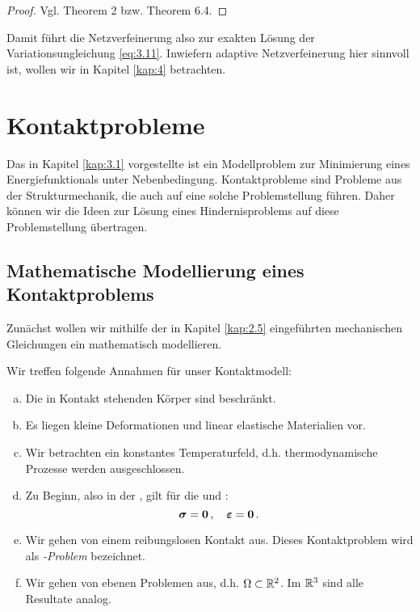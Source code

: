 \begin{proof}
Vgl. \cite{Falk} Theorem 2 bzw. \cite{EPS} Theorem 6.4.
\end{proof}


Damit führt die Netzverfeinerung also zur exakten Lösung der Variationsungleichung \eqref{eq:3.11}. Inwiefern adaptive Netzverfeinerung hier sinnvoll ist, wollen wir in Kapitel \ref{kap:4} betrachten.








\section{Kontaktprobleme}
\label{kap:3.2}


Das in Kapitel \ref{kap:3.1} vorgestellte  ist ein Modellproblem zur Minimierung eines Energiefunktionals unter Nebenbedingung. Kontaktprobleme sind Probleme aus der Strukturmechanik, die auch auf eine solche Problemstellung führen. Daher können wir die Ideen zur Lösung eines Hindernisproblems auf diese Problemstellung übertragen.


\subsection{Mathematische Modellierung eines Kontaktproblems}
\label{kap:3.2.1}

Zunächst wollen wir mithilfe der in Kapitel \ref{kap:2.5} eingeführten mechanischen Gleichungen ein  mathematisch modellieren.

\begin{vor}\label{vor:3.18}
Wir treffen folgende Annahmen für unser Kontaktmodell:
\begin{enumerate}[(a)]
\item Die in Kontakt stehenden Körper sind beschränkt.
\item Es liegen kleine Deformationen und linear elastische Materialien vor.
\item Wir betrachten ein konstantes Temperaturfeld, d.h. thermodynamische Prozesse werden ausgeschlossen.
\item Zu Beginn, also in der , gilt für die  und : 
\[
	\boldsymbol \sigma = \boldsymbol 0\, , \quad \boldsymbol {\varepsilon} =\boldsymbol 0 \, .
\]
\item Wir gehen von einem reibungslosen Kontakt aus. Dieses Kontaktproblem wird als \textit{-Problem} bezeichnet.
\item Wir gehen von ebenen Problemen aus, d.h. $\Omega \subset \mathbb{R}^2$. Im $\mathbb{R}^3$ sind alle Resultate analog.
\end{enumerate}
\end{vor}



